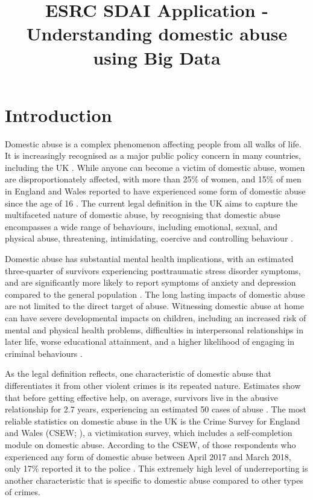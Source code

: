 \documentclass[11pt, a4paper]{article}
\begin{document}
\title{ESRC SDAI Application - Understanding domestic abuse using Big Data}
\date{}
\maketitle

\section{Introduction}

Domestic abuse is a complex phenomenon affecting people from all walks of life. It is increasingly recognised as a major public policy concern in many countries, including the UK \cite{ep}. While anyone can become a victim of domestic abuse, women are disproportionately affected, with more than 25\% of women, and 15\% of men in England and Wales reported to have experienced some form of domestic abuse since the age of 16 \cite{ONS}.  The current legal definition in the UK aims to capture the multifaceted nature of domestic abuse, by recognising that domestic abuse encompasses a wide range of behaviours, including emotional, sexual, and physical abuse, threatening, intimidating, coercive and controlling behaviour \cite{govuk}. 

Domestic abuse has substantial mental health implications, with an estimated three-quarter of survivors experiencing posttraumatic stress disorder symptoms, and are significantly more likely to report symptoms of anxiety and depression compared to the general population \cite{ferrari}. The long lasting impacts of domestic abuse are not limited to the direct target of abuse. Witnessing domestic abuse at home can have severe developmental impacts on children, including an increased risk of mental and physical health problems, difficulties in interpersonal relationships in later life, worse educational attainment, and a higher likelihood of engaging in criminal behaviours \cite{callaghan}.

As the legal definition reflects, one characteristic of domestic abuse that differentiates it from other violent crimes is its repeated nature. Estimates show that before getting effective help, on average, survivors live in the abusive relationship for 2.7 years, experiencing an estimated 50 cases of abuse \cite{SafeLives2015}. The most reliable statistics on domestic abuse in the UK is the Crime Survey for England and Wales (CSEW; ), a victimisation survey, which includes a self-completion module on domestic abuse. According to the CSEW, of those respondents who experienced any form of domestic abuse between April 2017 and March 2018, only 17\% reported it to the police \cite{ONS}. This extremely high level of underreporting is another characteristic that is specific to domestic abuse compared to other types of crimes. 
\end{document}

